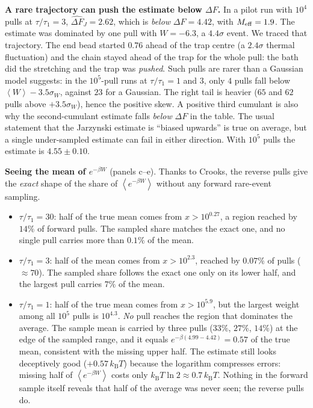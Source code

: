 \documentclass[11pt,a4paper]{article}
\newcommand{\kT}{k_{\mathrm B}T}
\newcommand{\avg}[1]{\left\langle #1\right\rangle}
\newcommand{\dFJ}{\widehat{\Delta F}_J}
\begin{document}
\noindent\textbf{A rare trajectory can push the estimate below $\Delta F$.} In a pilot run
with $10^4$ pulls at $\tau/\tau_1=3$, $\dFJ=2.62$, which is \emph{below} $\Delta F=4.42$, with
$M_{\rm eff}=1.9$. The estimate was dominated by one pull with $W=-6.3$, a $4.4\sigma$ event. We
traced that trajectory. The end bead started $0.76$ ahead of the trap centre (a $2.4\sigma$ thermal
fluctuation) and the chain stayed ahead of the trap for the whole pull: the bath did the
stretching and the trap was \emph{pushed}. Such pulls are rarer than a Gaussian model
suggests: in the $10^5$-pull runs at $\tau/\tau_1=1$ and $3$, only $4$ pulls fall below
$\avg W-3.5\sigma_W$, against $23$ for a Gaussian. The right tail is heavier ($65$ and $62$ pulls
above $+3.5\sigma_W$), hence the positive skew. A positive third cumulant is also why the second-cumulant
estimate falls \emph{below} $\Delta F$ in the table. The usual
statement that the Jarzynski estimate is ``biased upwards'' is true on average, but a single
under-sampled estimate can fail in either direction. With $10^5$ pulls the estimate is
$4.55\pm0.10$.

\noindent\textbf{Seeing the mean of $e^{-\beta W}$} (panels c--e). Thanks to Crooks, the reverse pulls
give the \emph{exact} shape of the share of $\avg{e^{-\beta W}}$ without any forward rare-event sampling.
\begin{itemize}[leftmargin=*,itemsep=1pt]
\item $\tau/\tau_1=30$: half of the true mean comes from $x>10^{0.27}$, a region reached by $14\%$ of
forward pulls. The sampled share matches the exact one, and no single pull carries more than $0.1\%$ of the mean.
\item $\tau/\tau_1=3$: half of the mean comes from $x>10^{2.3}$, reached by $0.07\%$ of pulls ($\approx70$).
The sampled share follows the exact one only on its lower half, and the largest pull carries $7\%$ of the mean.
\item $\tau/\tau_1=1$: half of the true mean comes from $x>10^{5.9}$, but the largest weight among all
$10^5$ pulls is $10^{4.3}$. \emph{No} pull reaches the region that dominates the average. The sample
mean is carried by three pulls ($33\%$, $27\%$, $14\%$) at the edge of the sampled range, and it equals
$e^{-\beta(4.99-4.42)}=0.57$ of the true mean, consistent with the missing upper half. The estimate
still looks deceptively good ($+0.57\,\kT$) because the logarithm compresses errors: missing half
of $\avg{e^{-\beta W}}$ costs only $\kT\ln2\approx0.7\,\kT$. Nothing in the forward sample itself reveals
that half of the average was never seen; the reverse pulls do.
\end{itemize}
\end{document}

